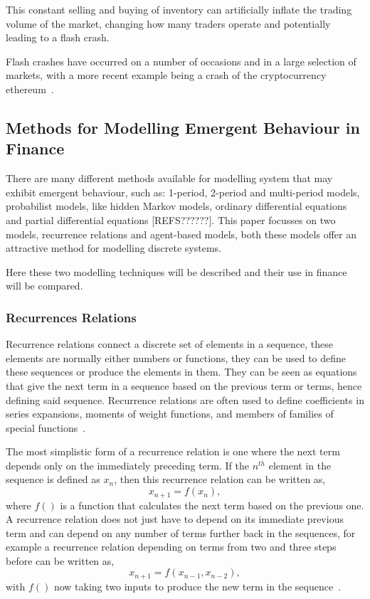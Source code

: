 \documentclass{article}
\begin{document}
This constant selling and buying of inventory can artificially inflate the trading volume of the market, changing how many traders operate and potentially leading to a flash crash.

Flash crashes have occurred on a number of occasions and in a large selection of markets, with a more recent example being a crash of the cryptocurrency ethereum~\cite{cryptocrash}.


\subsection{Methods for Modelling Emergent Behaviour in Finance}
There are many different methods available for modelling system that may exhibit emergent behaviour, such as: 1-period, 2-period and multi-period models, probabilist models, like hidden Markov models, ordinary differential equations and partial differential equations [REFS??????]. This paper focusses on two models, recurrence relations and agent-based models, both these models offer an attractive method for modelling discrete systems.

Here these two modelling techniques will be described and their use in finance will be compared.  

\subsubsection{Recurrences Relations} 
Recurrence relations connect a discrete set of elements in a sequence, these elements are normally either numbers or functions, they can be used to define these sequences or produce the elements in them. They can be seen as equations that give the next term in a sequence based on the previous term or terms, hence defining said sequence. Recurrence relations are often used to define coefficients in series expansions, moments of weight functions, and members of families of special functions~\cite{recurrelationbook}.

The most simplistic form of a recurrence relation is one where the next term depends only on the immediately preceding term. If the $n^{th}$ element in the sequence is defined as  $x_{n}$, then this recurrence relation can be written as,    
\begin{equation}
x_{n+1} = f(x_{n}),
\end{equation}
where $f()$ is a function that calculates the next term based on the previous one. A recurrence relation does not just have to depend on its immediate previous term and can depend on any number of terms further back in the sequences, for example a recurrence relation depending on terms from two and three steps before can be written as, 
\begin{equation}
x_{n+1} = f(x_{n-1}, x_{n-2}),
\end{equation}
with $f()$ now taking two inputs to produce the new term in the sequence~\cite{recurrealtionwebpage}.
\end{document}
